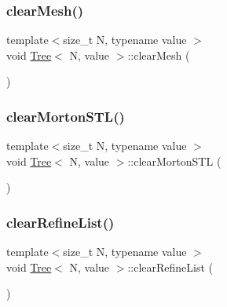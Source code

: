 \mbox{\label{classTree_a3dab87d8315821f5ee2cc20a1b80c393}} 
\subsubsection{\texorpdfstring{clear\+Mesh()}{clearMesh()}}
{\footnotesize\ttfamily template$<$size\+\_\+t N, typename value $>$ \\
void \mbox{\hyperlink{classTree}{Tree}}$<$ N, value $>$\+::clear\+Mesh (\begin{DoxyParamCaption}{ }\end{DoxyParamCaption})}

\mbox{\label{classTree_a2c51dee6b6d3a07a38fbd465adab62f8}} 
\subsubsection{\texorpdfstring{clear\+Morton\+S\+T\+L()}{clearMortonSTL()}}
{\footnotesize\ttfamily template$<$size\+\_\+t N, typename value $>$ \\
void \mbox{\hyperlink{classTree}{Tree}}$<$ N, value $>$\+::clear\+Morton\+S\+TL (\begin{DoxyParamCaption}{ }\end{DoxyParamCaption})}

\mbox{\label{classTree_ad047a737bb54fe039333c284f80994df}} 
\subsubsection{\texorpdfstring{clear\+Refine\+List()}{clearRefineList()}}
{\footnotesize\ttfamily template$<$size\+\_\+t N, typename value $>$ \\
void \mbox{\hyperlink{classTree}{Tree}}$<$ N, value $>$\+::clear\+Refine\+List (\begin{DoxyParamCaption}{ }\end{DoxyParamCaption})}

\mbox{\label{classTree_a56922413af6789f6ca5f64e110dc269b}} 
